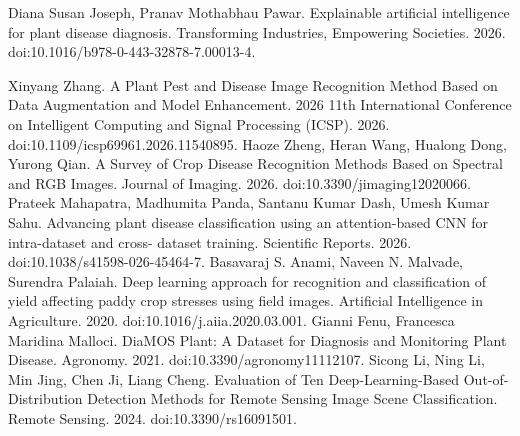  Diana Susan Joseph, Pranav Mothabhau Pawar. Explainable artificial intelligence for plant disease diagnosis. Transforming Industries, Empowering Societies. 2026. doi:10.1016/b978-0-443-32878-7.00013-4.

 Xinyang Zhang. A Plant Pest and Disease Image Recognition Method Based on Data Augmentation and Model Enhancement. 2026 11th International Conference on Intelligent Computing and Signal Processing (ICSP). 2026. doi:10.1109/icsp69961.2026.11540895.
 Haoze Zheng, Heran Wang, Hualong Dong, Yurong Qian. A Survey of Crop Disease Recognition Methods Based on Spectral and RGB Images. Journal of Imaging. 2026. doi:10.3390/jimaging12020066.
 Prateek Mahapatra, Madhumita Panda, Santanu Kumar Dash, Umesh Kumar Sahu. Advancing plant disease classification using an attention-based CNN for intra-dataset and cross- dataset training. Scientific Reports. 2026. doi:10.1038/s41598-026-45464-7.
 Basavaraj S. Anami, Naveen N. Malvade, Surendra Palaiah. Deep learning approach for recognition and classification of yield affecting paddy crop stresses using field images. Artificial Intelligence in Agriculture. 2020. doi:10.1016/j.aiia.2020.03.001.
 Gianni Fenu, Francesca Maridina Malloci. DiaMOS Plant: A Dataset for Diagnosis and Monitoring Plant Disease. Agronomy. 2021. doi:10.3390/agronomy11112107.
 Sicong Li, Ning Li, Min Jing, Chen Ji, Liang Cheng. Evaluation of Ten Deep-Learning-Based Out-of-Distribution Detection Methods for Remote Sensing Image Scene Classification. Remote Sensing. 2024. doi:10.3390/rs16091501.
